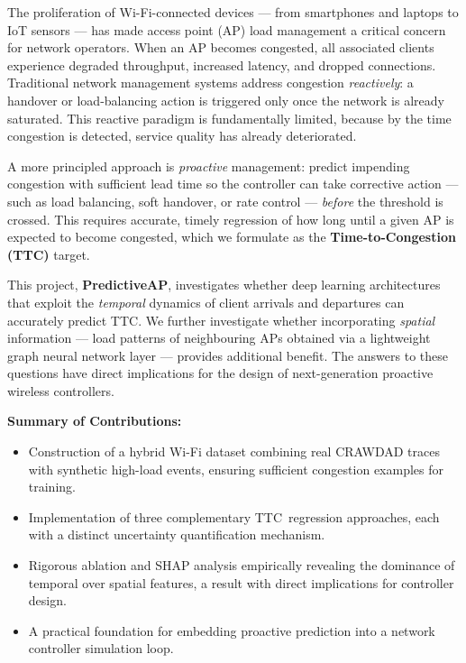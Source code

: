 \documentclass[12pt,a4paper]{article}
\newcommand{\ttc}{\textsc{TTC}}
\newcommand{\predap}{\textbf{PredictiveAP}}
\begin{document}
The proliferation of Wi-Fi-connected devices — from smartphones and laptops to IoT sensors — has made access point (AP) load management a critical concern for network operators. When an AP becomes congested, all associated clients experience degraded throughput, increased latency, and dropped connections. Traditional network management systems address congestion \emph{reactively}: a handover or load-balancing action is triggered only once the network is already saturated. This reactive paradigm is fundamentally limited, because by the time congestion is detected, service quality has already deteriorated.

A more principled approach is \emph{proactive} management: predict impending congestion with sufficient lead time so the controller can take corrective action — such as load balancing, soft handover, or rate control — \emph{before} the threshold is crossed. This requires accurate, timely regression of how long until a given AP is expected to become congested, which we formulate as the \textbf{Time-to-Congestion (\ttc)} target.

This project, \predap, investigates whether deep learning architectures that exploit the \emph{temporal} dynamics of client arrivals and departures can accurately predict \ttc. We further investigate whether incorporating \emph{spatial} information — load patterns of neighbouring APs obtained via a lightweight graph neural network layer — provides additional benefit. The answers to these questions have direct implications for the design of next-generation proactive wireless controllers.

\medskip
\noindent\textbf{Summary of Contributions:}
\begin{itemize}[noitemsep, topsep=4pt]
    \item Construction of a hybrid Wi-Fi dataset combining real CRAWDAD traces with synthetic high-load events, ensuring sufficient congestion examples for training.
    \item Implementation of three complementary \ttc\ regression approaches, each with a distinct uncertainty quantification mechanism.
    \item Rigorous ablation and SHAP analysis empirically revealing the dominance of temporal over spatial features, a result with direct implications for controller design.
    \item A practical foundation for embedding proactive prediction into a network controller simulation loop.
\end{itemize}
\end{document}
